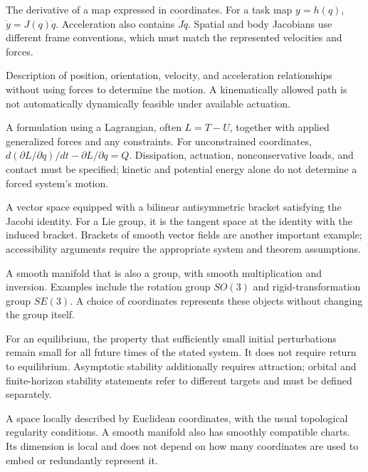 \begin{description}[style=nextline,leftmargin=0pt,font=\bfseries,itemsep=0.5em]
\item[Jacobian]
The derivative of a map expressed in coordinates. For a task map $y=h(q)$, $\dot y=J(q)\dot q$. Acceleration also contains $\dot J\dot q$. Spatial and body Jacobians use different frame conventions, which must match the represented velocities and forces.

\item[Kinematics]
Description of position, orientation, velocity, and acceleration relationships without using forces to determine the motion. A kinematically allowed path is not automatically dynamically feasible under available actuation.

\item[Lagrangian Mechanics]
A formulation using a Lagrangian, often $L=T-U$, together with applied generalized forces and any constraints. For unconstrained coordinates, $d(\partial L/\partial\dot q)/dt-\partial L/\partial q=Q$. Dissipation, actuation, nonconservative loads, and contact must be specified; kinetic and potential energy alone do not determine a forced system's motion.

\item[Lie Algebra]
A vector space equipped with a bilinear antisymmetric bracket satisfying the Jacobi identity. For a Lie group, it is the tangent space at the identity with the induced bracket. Brackets of smooth vector fields are another important example; accessibility arguments require the appropriate system and theorem assumptions.

\item[Lie Group]
A smooth manifold that is also a group, with smooth multiplication and inversion. Examples include the rotation group $SO(3)$ and rigid-transformation group $SE(3)$. A choice of coordinates represents these objects without changing the group itself.

\item[Lyapunov Stability]
For an equilibrium, the property that sufficiently small initial perturbations remain small for all future times of the stated system. It does not require return to equilibrium. Asymptotic stability additionally requires attraction; orbital and finite-horizon stability statements refer to different targets and must be defined separately.

\item[Manifold]
A space locally described by Euclidean coordinates, with the usual topological regularity conditions. A smooth manifold also has smoothly compatible charts. Its dimension is local and does not depend on how many coordinates are used to embed or redundantly represent it.


\end{description}
